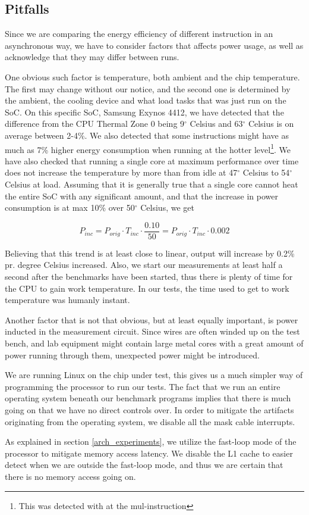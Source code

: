 \subsection{Pitfalls}
Since we are comparing the energy efficiency of different instruction in an
asynchronous way, we have to consider factors that affects power usage, as well
as acknowledge that they may differ between runs.

One obvious such factor is temperature, both ambient and the chip temperature.
The first may change without our notice, and the second one is determined by the
ambient, the cooling device and what load tasks that was just run on the SoC. On
this specific SoC, Samsung Exynos 4412, we have detected that the difference
from the CPU Thermal Zone 0 being 9$^\circ$ Celsius and 63$^\circ$ Celsius is on
average between 2-4\%. We also detected that some instructions might have as
much as 7\% higher energy consumption when running at the hotter
level\footnote{This was detected with at the {\ttfamily mul}-instruction}. We
have also checked that running a single core at maximum performance over time
does not increase the temperature by more than from idle at 47$^\circ$ Celsius
to 54$^\circ$ Celsius at load. Assuming that it is generally true that a single
core cannot heat the entire SoC with any significant amount, and that the
increase in power consumption is at max 10\% over 50$^\circ$ Celsius, we get

\begin{equation}
    P_{inc} = P_{orig} \cdot T_{inc} \cdot \frac{0.10}{50} = P_{orig} \cdot T_{inc} \cdot 0.002
\end{equation}

Believing that this trend is at least close to linear, output will increase by
0.2\% pr.  degree Celsius increased. Also, we start our measurements at least
half a second after the benchmarks have been started, thus there is plenty of
time for the CPU to gain work temperature. In our tests, the time used to get to
work temperature was humanly instant.

Another factor that is not that obvious, but at least equally important, is
power inducted in the measurement circuit. Since wires are often winded up on
the test bench, and lab equipment might contain large metal cores with a great
amount of power running through them, unexpected power might be introduced.

We are running Linux on the chip under test, this gives us a much simpler way of
programming the processor to run our tests. The fact that we run an entire
operating system beneath our benchmark programs implies that there is much going
on that we have no direct controls over.  In order to mitigate the artifacts
originating from the operating system, we disable all the mask cable interrupts.

As explained in section \ref{arch_experiments}, we utilize the fast-loop mode of
the processor to mitigate memory access latency. We disable the L1 cache to
easier detect when we are outside the fast-loop mode, and thus we are certain
that there is no memory access going on.
